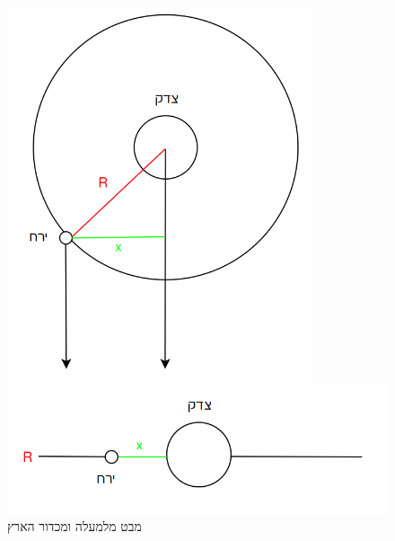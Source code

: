 \documentclass[a4paper, 12pt]{article}
\begin{document}
    \begin{figure}[h!]
        \centering
        \begin{minipage}{0.4\textwidth}
            \centering
            \includegraphics[width=0.8\textwidth]{../assets/orbit_from_above_01.png}
        \end{minipage}\hfill
        \begin{minipage}{0.55\textwidth}
            \centering
            \includegraphics[width=\textwidth]{../assets/orbit_from_earth_01.png}
        \end{minipage}
        \caption{מבט מלמעלה ומכדור הארץ}
        \label{orbit_01}
    \end{figure}
\end{document}
